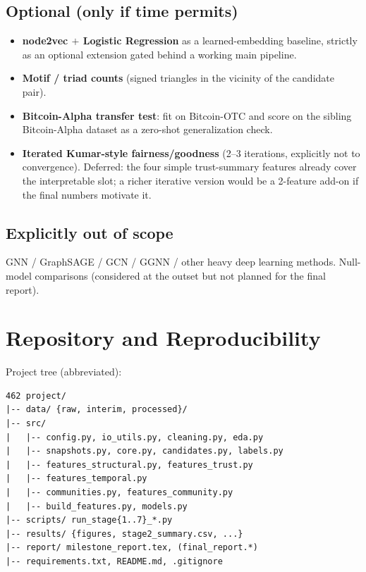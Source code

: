 \documentclass[11pt,a4paper]{article}
\begin{document}
\subsection{Optional (only if time permits)}
\begin{itemize}[nosep]
  \item \textbf{node2vec $+$ Logistic Regression} as a learned-embedding
        baseline, strictly as an optional extension gated behind a working
        main pipeline.
  \item \textbf{Motif / triad counts} (signed triangles in the vicinity of
        the candidate pair).
  \item \textbf{Bitcoin-Alpha transfer test}: fit on Bitcoin-OTC and score
        on the sibling Bitcoin-Alpha dataset as a zero-shot generalization
        check.
  \item \textbf{Iterated Kumar-style fairness/goodness} (2--3 iterations,
        explicitly not to convergence). Deferred: the four simple
        trust-summary features already cover the interpretable slot; a
        richer iterative version would be a 2-feature add-on if the final
        numbers motivate it.
\end{itemize}

\subsection{Explicitly out of scope}
GNN / GraphSAGE / GCN / GGNN / other heavy deep learning methods. Null-model
comparisons (considered at the outset but not planned for the final report).

\section{Repository and Reproducibility}

Project tree (abbreviated):
\begin{verbatim}
462 project/
|-- data/ {raw, interim, processed}/
|-- src/
|   |-- config.py, io_utils.py, cleaning.py, eda.py
|   |-- snapshots.py, core.py, candidates.py, labels.py
|   |-- features_structural.py, features_trust.py
|   |-- features_temporal.py
|   |-- communities.py, features_community.py
|   |-- build_features.py, models.py
|-- scripts/ run_stage{1..7}_*.py
|-- results/ {figures, stage2_summary.csv, ...}
|-- report/ milestone_report.tex, (final_report.*)
|-- requirements.txt, README.md, .gitignore
\end{verbatim}
\end{document}
